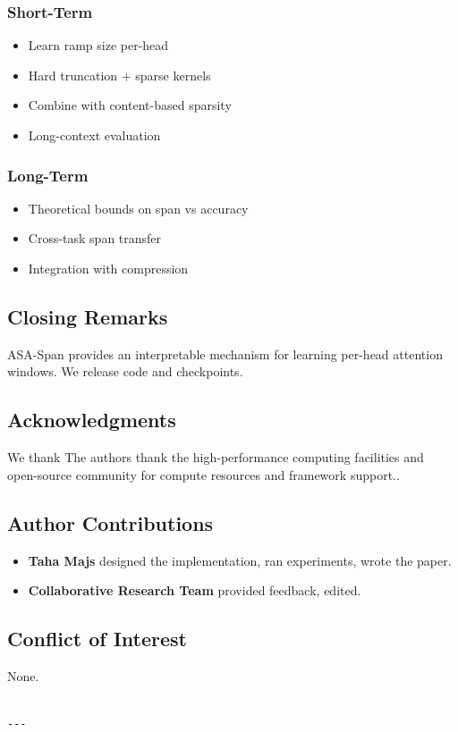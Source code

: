 \subsubsection{Short-Term}
\begin{itemize}
\item Learn ramp size per-head
\item Hard truncation + sparse kernels
\item Combine with content-based sparsity
\item Long-context evaluation

\end{itemize}
\subsubsection{Long-Term}
\begin{itemize}
\item Theoretical bounds on span vs accuracy
\item Cross-task span transfer
\item Integration with compression

\end{itemize}
\subsection{Closing Remarks}

ASA-Span provides an interpretable mechanism for learning per-head attention 
windows. We release code and checkpoints.

\subsection{Acknowledgments}

We thank The authors thank the high-performance computing facilities and open-source community for compute resources and framework support..

\subsection{Author Contributions}

\begin{itemize}
\item \textbf{Taha Majs} designed the implementation, ran experiments, wrote the paper.
\item \textbf{Collaborative Research Team} provided feedback, edited.

\end{itemize}
\subsection{Conflict of Interest}

None.
\begin{lstlisting}

---
\end{lstlisting}
